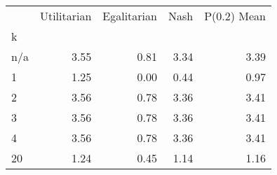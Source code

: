 \begin{tabular}{lrrrr}
\toprule
 & Utilitarian & Egalitarian & Nash & P(0.2) Mean \\
k &  &  &  &  \\
\midrule
n/a & 3.55 & 0.81 & 3.34 & 3.39 \\
1 & 1.25 & 0.00 & 0.44 & 0.97 \\
2 & 3.56 & 0.78 & 3.36 & 3.41 \\
3 & 3.56 & 0.78 & 3.36 & 3.41 \\
4 & 3.56 & 0.78 & 3.36 & 3.41 \\
20 & 1.24 & 0.45 & 1.14 & 1.16 \\
\bottomrule
\end{tabular}

